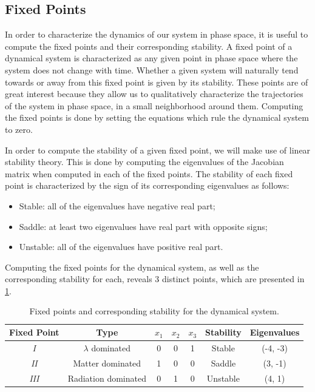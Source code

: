 \subsection{Fixed Points}
\label{subsec:fixed-points}

In order to characterize the dynamics of our system in phase space, it is useful to compute the fixed points and their corresponding stability. A fixed point of a dynamical system is characterized as any given point in phase space where the system does not change with time. Whether a given system will naturally tend towards or away from this fixed point is given by its stability. These points are of great interest because they allow us to qualitatively characterize the trajectories of the system in phase space, in a small neighborhood around them. Computing the fixed points is done by setting the equations which rule the dynamical system to zero.

In order to compute the stability of a given fixed point, we will make use of linear stability theory. This is done by computing the eigenvalues of the Jacobian matrix when computed in each of the fixed points. The stability of each fixed point is characterized by the sign of its corresponding eigenvalues as follows:

\begin{itemize}
    \item Stable: all of the eigenvalues have negative real part;
    \item Saddle: at least two eigenvalues have real part with opposite signs;
    \item Unstable: all of the eigenvalues have positive real part.
\end{itemize}

\noindent Computing the fixed points for the dynamical system, as well as the corresponding stability for each, reveals 3 distinct points, which are presented in \cref{tab:fixed-points}.

\vspace{0.5cm}

\begin{table}[h!]
    \centering
    \begin{tabular}{|c|c|c|c|c|c|c|}
        \hline
        Fixed Point & Type                 & $x_1$ & $x_2$ & $x_3$ & Stability & Eigenvalues \\
        \hline
        \textit{I}  & $\lambda$ dominated  & 0     & 0     & 1     & Stable    & (-4, -3)    \\
        \hline
        \textit{II} & Matter dominated     & 1     & 0     & 0     & Saddle    & (3, -1)     \\
        \hline
        \textit{III} & Radiation dominated & 0     & 1     & 0     & Unstable  & (4, 1)      \\
        \hline
    \end{tabular}
    \caption[Fixed points and corresponding stability for the dynamical system of a cosmological model with a function $f(Q)$ that replicates dark energy.]
    {Fixed points and corresponding stability for the dynamical system.}
    \label{tab:fixed-points}
\end{table}

